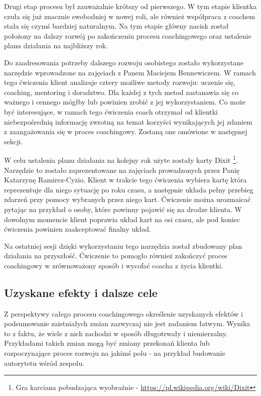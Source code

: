 Drugi etap procesu był zauważalnie krótszy od pierwszego. W tym etapie klientka czuła się już znacznie swobodniej w nowej roli, ale również współpraca
z coachem stała się czymś bardziej naturalnym. Na tym etapie główny nacisk został położony na dalszy rozwój po zakończeniu procesu coachingowego
oraz ustalenie planu działania na najbliższy rok.

Do zaadresowania potrzeby dalszego rozwoju osobistego zostało wykorzystane narzędzie wprowadzone na zajęciach z Panem Maciejem Bennewiczem. W ramach tego
ćwiczenia klient analizuje cztery możliwe metody rozwoju: uczenie się, coaching, mentoring i doradztwo. Dla każdej z tych metod zastanawia się
co ważnego i cennego mógłby lub powinien zrobić z jej wykorzystaniem. Co może być interesujące, w ramach tego ćwiczenia coach otrzymał od klientki
niebezpośrednią informację zwrotną na temat korzyści wynikających jej zdaniem z zaangażowania się w proces coachingowy. Zostaną one omówione w
następnej sekcji.

W celu ustalenia planu działania na kolejny rok użyte zostały karty Dixit
\footnote{Gra karciana pobudzająca wyobraźnie - \url{https://pl.wikipedia.org/wiki/Dixit}}. Narzędzie to zostało zaprezentowane na zajęciach
prowadzonych przez Panię Katarzynę Ramirez-Cyzio. Klient w trakcie tego ćwiczenia wybiera kartę która reprezentuje dla niego sytuację po roku czasu,
a następnie układa pełny przebieg zdarzeń przy pomocy wybranych przez niego kart. Ćwiczenie można urozmaicać pytając na przykład o osoby, które powinny
pojawić się na drodze klienta. W dowolnym momencie klient poprawia układ kart na osi czasu, ale pod koniec ćwiczenia powinien zaakceptować finalny układ.

Na ostatniej sesji dzięki wykorzystaniu tego narzędzia został zbudowany plan działania na przyszłość. Ćwiczenie to pomogło również zakończyć
proces coachingowy w zrównoważony sposób i wycofać coacha z życia klientki.

\subsection{Uzyskane efekty i dalsze cele}

Z perspektywy całego procesu coachingowego określenie uzyskanych efektów i podsumowanie zaistniałych zmian zazwyczaj nie jest zadaniem łatwym.
Wynika to z faktu, że wiele z nich zachodzi w sposób długotrwały i niemierzalny. Przykładami takich zmian mogą być zmiany przekonań klienta lub
rozpoczynające proces rozwoju na jakimś polu - na przykład budowanie autorytetu wśród zespołu.

